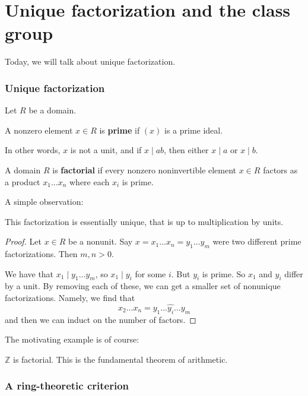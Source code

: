 \chapter{Unique factorization and the class group}


Today, we will talk about unique factorization.

\subsection{Unique factorization}

Let $R$ be a domain.  
\begin{definition} 
A nonzero element $x \in R$ is \textbf{prime} if $(x)$ is a prime ideal.
\end{definition} 

In other words, $x$ is not a unit, and if $x \mid ab$, then either $x \mid a$
or $x \mid b$. 

\begin{definition} 
A domain $R$ is \textbf{factorial} if every nonzero noninvertible element $x \in R$ factors as a
product $ x_1 \dots x_n$ where each $x_i$ is prime. 
\end{definition}

A simple observation:
\begin{proposition} 
This factorization is essentially unique, that is up to multiplication by units.
\end{proposition} 
\begin{proof} Let $x \in R$ be a nonunit. 
Say $x = x_1 \dots x_n = y_1 \dots y_m$ were two different prime
factorizations. Then $m,n>0$. 

We have that $x_1 \mid y_1 \dots y_m$, so $x_1 \mid y_i$ for some $i$. But
$y_i$ is prime. So $x_1$ and $y_i$ differ by a unit. By removing each of these,
we can get  a smaller set of nonunique factorizations. 
Namely, we find that
\[ x_2 \dots x_n = y_1 \dots \hat{y_i} \dots y_m  \]
and then we can induct on the number of factors.
\end{proof} 

The motivating example is of course:
\begin{example} 
$\mathbb{Z}$ is factorial. This is the fundamental theorem of arithmetic. 
\end{example} 

\subsection{A ring-theoretic criterion}

